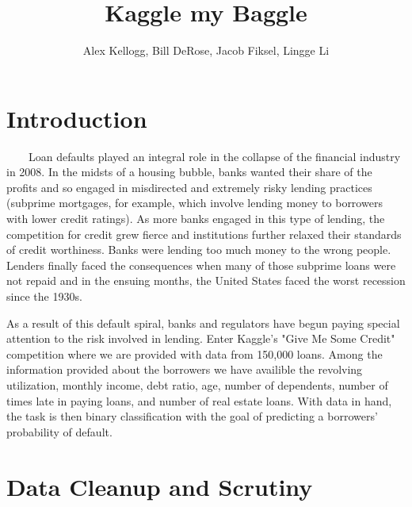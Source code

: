 \documentclass[11pt, oneside]{article}   	%
\title{Kaggle my Baggle}
\author{Alex Kellogg, Bill DeRose, Jacob Fiksel, Lingge Li}
\begin{document}
\maketitle
\section{Introduction}
	 ~~~~Loan defaults played an integral role in the collapse of the financial industry in 2008. 
	In the midsts of a housing bubble, banks wanted their share of the profits and so engaged in
	 misdirected and extremely risky lending practices (subprime mortgages, for example, which involve lending money to borrowers with lower credit ratings). 
	 As more banks engaged in this type of lending, the competition for credit grew fierce and
	 institutions further relaxed their standards of credit worthiness. Banks were lending too 
	 much money to the wrong people. Lenders finally faced the consequences when many of 
	 those subprime loans were not repaid and in the ensuing months, the United States faced the 
	 worst recession since the 1930s. 
	 
	 As a result of this default spiral, banks and regulators have begun paying special attention to
	 the risk involved in lending. Enter Kaggle's "Give Me Some Credit" competition where
	 we are provided with data from 150,000 loans. Among the information provided about the 
	 borrowers we have availible the revolving utilization, monthly income, debt ratio, age, number
	 of dependents, number of times late in paying loans, and number of real estate loans. 
	 With data in hand, the task is then binary classification with the goal of predicting a borrowers'
	 probability of default. 

\section{Data Cleanup and Scrutiny}
\end{document}
